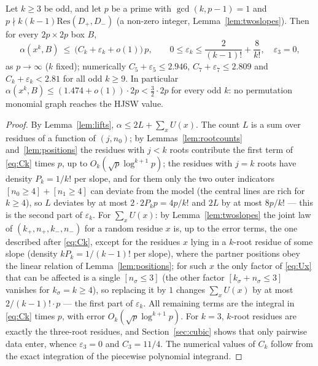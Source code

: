 \begin{theorem}\label{thm:perm}
Let $k\ge3$ be odd, and let $p$ be a prime with $\gcd(k,p-1)=1$ and $p\nmid k(k-1)\mathrm{Res}(D_+,D_-)$ (a non-zero integer, Lemma~\ref{lem:twoslopes}).
Then for every $2p\times2p$ box $B$,
\[
 \alpha(x^k,B)\ \le\ \bigl(C_k+\varepsilon_k+o(1)\bigr)\,p,\qquad 0\le\varepsilon_k\le\frac2{(k-1)!}+\frac8{k!},\quad \varepsilon_3=0,
\]
as $p\to\infty$ ($k$ fixed); numerically $C_5+\varepsilon_5\le2.946$, $C_7+\varepsilon_7\le2.809$ and $C_k+\varepsilon_k<2.81$ for all odd $k\ge9$.  In particular
$\alpha(x^k,B)\le(1.474+o(1))\cdot2p<\tfrac32\cdot2p$ for every odd $k$: no permutation monomial graph reaches the HJSW value.
\end{theorem}
\begin{proof}
By Lemma~\ref{lem:lifts}, $\alpha\le2L+\sum_xU(x)$.  The count $L$ is a sum over residues of a function of $(j,n_0)$; by Lemmas~\ref{lem:rootcounts}
and~\ref{lem:positions} the residues with $j<k$ roots contribute the first term of \eqref{eq:Ck} times $p$, up to $O_k(\sqrt p\log^{k+1}p)$; the residues
with $j=k$ roots have density $P_k=1/k!$ per slope, and for them only the two outer indicators $[n_0\ge4]+[n_1\ge4]$ can deviate from the model
(the central lines are rich for $k\ge4$), so $L$ deviates by at most $2\cdot2P_kp=4p/k!$ and $2L$ by at most $8p/k!$ — this is the second part of
$\varepsilon_k$.  For $\sum_xU(x)$: by Lemma~\ref{lem:twoslopes} the joint law of $(k_+,n_+,k_-,n_-)$ for a random residue $x$ is, up to the error terms, the
one described after \eqref{eq:Ck}, except for the residues $x$ lying in a $k$-root residue of some slope (density $kP_k=1/(k-1)!$ per slope), where the
partner positions obey the linear relation of Lemma~\ref{lem:positions}; for such $x$ the only factor of \eqref{eq:Ux} that can be affected is a single
$[n_\sigma\le3]$ (the other factor $[k_\sigma+n_\sigma\le3]$ vanishes for $k_\sigma=k\ge4$), so replacing it by $1$ changes $\sum_xU(x)$ by at most
$2/(k-1)!\cdot p$ — the first part of $\varepsilon_k$.  All remaining terms are the integral in \eqref{eq:Ck} times $p$, with error $O_k(\sqrt p\log^{k+1}p)$.
For $k=3$, $k$-root residues are exactly the three-root residues, and Section~\ref{sec:cubic} shows that only pairwise data enter, whence $\varepsilon_3=0$
and $C_3=11/4$.  The numerical values of $C_k$ follow from the exact integration of the piecewise polynomial integrand.
\end{proof}

